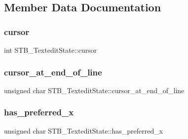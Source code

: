 \subsection{Member Data Documentation}
\hypertarget{struct_s_t_b___textedit_state_a7a1414f3286070306a5184f9473ccf9f}{}\label{struct_s_t_b___textedit_state_a7a1414f3286070306a5184f9473ccf9f} 
\subsubsection{\texorpdfstring{cursor}{cursor}}
{\footnotesize\ttfamily int S\+T\+B\+\_\+\+Textedit\+State\+::cursor}

\hypertarget{struct_s_t_b___textedit_state_a0e7ba5f610f5dc2d643bef0f223ada9c}{}\label{struct_s_t_b___textedit_state_a0e7ba5f610f5dc2d643bef0f223ada9c} 
\subsubsection{\texorpdfstring{cursor\+\_\+at\+\_\+end\+\_\+of\+\_\+line}{cursor\_at\_end\_of\_line}}
{\footnotesize\ttfamily unsigned char S\+T\+B\+\_\+\+Textedit\+State\+::cursor\+\_\+at\+\_\+end\+\_\+of\+\_\+line}

\hypertarget{struct_s_t_b___textedit_state_aaca2d581ed565f86288038816274e007}{}\label{struct_s_t_b___textedit_state_aaca2d581ed565f86288038816274e007} 
\subsubsection{\texorpdfstring{has\+\_\+preferred\+\_\+x}{has\_preferred\_x}}
{\footnotesize\ttfamily unsigned char S\+T\+B\+\_\+\+Textedit\+State\+::has\+\_\+preferred\+\_\+x}

\hypertarget{struct_s_t_b___textedit_state_a11a63150e95225aacd204d6ef160c0c0}{}\label{struct_s_t_b___textedit_state_a11a63150e95225aacd204d6ef160c0c0} 
